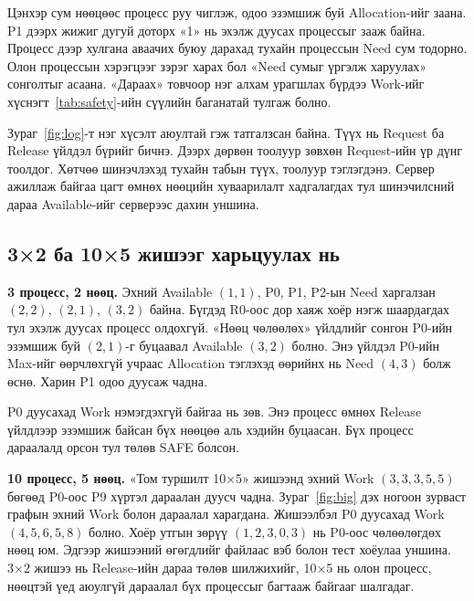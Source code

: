 Цэнхэр сум нөөцөөс процесс руу чиглэж, одоо эзэмшиж буй Allocation-ийг заана. P1 дээрх жижиг дугуй доторх «1» нь эхэлж дуусах процессыг зааж байна. Процесс дээр хулгана аваачих буюу дарахад тухайн процессын Need сум тодорно. Олон процессын хэрэгцээг зэрэг харах бол «Need сумыг үргэлж харуулах» сонголтыг асаана. «Дараах» товчоор нэг алхам урагшлах бүрдээ Work-ийг хүснэгт~\ref{tab:safety}-ийн сүүлийн баганатай тулгаж болно.

Зураг~\ref{fig:log}-т нэг хүсэлт аюултай гэж татгалзсан байна. Түүх нь Request ба Release үйлдэл бүрийг бичнэ. Дээрх дөрвөн тоолуур зөвхөн Request-ийн үр дүнг тоолдог. Хөтчөө шинэчлэхэд тухайн табын түүх, тоолуур тэглэгдэнэ. Сервер ажиллаж байгаа цагт өмнөх нөөцийн хуваарилалт хадгалагдах тул шинэчилсний дараа Available-ийг серверээс дахин уншина.
\newpage
\subsection{3×2 ба 10×5 жишээг харьцуулах нь}
\textbf{3 процесс, 2 нөөц.} Эхний Available $(1,1)$, P0, P1, P2-ын Need харгалзан $(2,2)$, $(2,1)$, $(3,2)$ байна. Бүгдэд R0-оос дор хаяж хоёр нэгж шаардагдах тул эхэлж дуусах процесс олдохгүй. «Нөөц чөлөөлөх» үйлдлийг сонгон P0-ийн эзэмшиж буй $(2,1)$-г буцаавал Available $(3,2)$ болно. Энэ үйлдэл P0-ийн Max-ийг өөрчлөхгүй учраас Allocation тэглэхэд өөрийнх нь Need $(4,3)$ болж өснө. Харин P1 одоо дуусаж чадна.

P0 дуусахад Work нэмэгдэхгүй байгаа нь зөв. Энэ процесс өмнөх Release үйлдлээр эзэмшиж байсан бүх нөөцөө аль хэдийн буцаасан. Бүх процесс дараалалд орсон тул төлөв SAFE болсон.

\textbf{10 процесс, 5 нөөц.} «Том туршилт 10×5» жишээнд эхний Work $(3,3,3,5,5)$ бөгөөд P0-оос P9 хүртэл дараалан дуусч чадна. Зураг~\ref{fig:big} дэх ногоон зурваст графын эхний Work болон дараалал харагдана. Жишээлбэл P0 дуусахад Work $(4,5,6,5,8)$ болно. Хоёр утгын зөрүү $(1,2,3,0,3)$ нь P0-оос чөлөөлөгдөх нөөц юм.
Эдгээр жишээний өгөгдлийг  файлаас вэб болон тест хоёулаа уншина. 3×2 жишээ нь Release-ийн дараа төлөв шилжихийг, 10×5 нь олон процесс, нөөцтэй үед аюулгүй дараалал бүх процессыг багтааж байгааг шалгадаг.
\newpage
